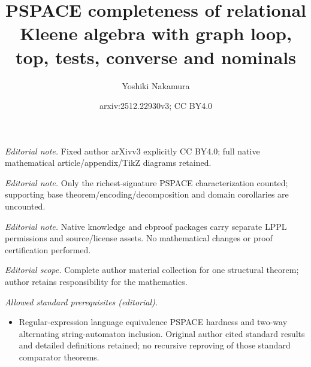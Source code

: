 \documentclass[10pt,a4paper]{article}
\title{PSPACE completeness of relational Kleene algebra with graph loop, top, tests, converse and nominals}
\author{Yoshiki Nakamura}
\date{arxiv:2512.22930v3; CC BY4.0}
\theoremstyle{definition}
\theoremstyle{remark}
\begin{document}
\maketitle
\noindent\textit{Editorial note.} Fixed author arXivv3 explicitly CC BY4.0; full native mathematical article/appendix/TikZ diagrams retained.\par\medskip
\noindent\textit{Editorial note.} Only the richest-signature PSPACE characterization counted; supporting base theorem/encoding/decomposition and domain corollaries are uncounted.\par\medskip
\noindent\textit{Editorial note.} Native knowledge and ebproof packages carry separate LPPL permissions and source/license assets. No mathematical changes or proof certification performed.\par\medskip
\noindent\textit{Editorial scope.} Complete author material collection for one structural theorem; author retains responsibility for the mathematics.\par\medskip
\noindent\textit{Allowed standard prerequisites (editorial).}\begin{itemize}
\item Regular-expression language equivalence PSPACE hardness and two-way alternating string-automaton inclusion. Original author cited standard results and detailed definitions retained; no recursive reproving of those standard comparator theorems.
\end{itemize}\medskip


%
%
%
%
%
%
%
%
%
%
%
%
%
%
%
%
%
%
%
%
%
\end{document}

